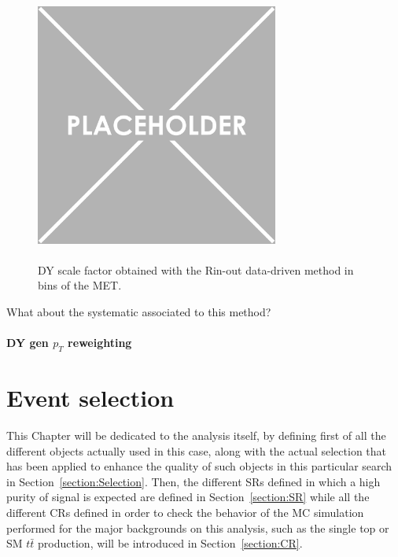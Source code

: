 \documentclass[a4paper, 10pt, openright]{report}
\begin{document}
\begin{figure}[htbp]
\begin{center}
\includegraphics[width=8cm, height=9cm]{figs/placeholder.png}
\caption{\ac{DY} scale factor obtained with the Rin-out data-driven method in bins of the \ac{MET}.}
\label{fig:Rinoutcheck}
\end{center}
\end{figure}

\color{red} What about the systematic associated to this method? \color{black}

\subsubsection{\ac{DY} gen $p_T$ reweighting}

























\chapter{Event selection} \label{chapter:Selection}

This Chapter will be dedicated to the analysis itself, by defining first of all the different objects actually used in this case, along with the actual selection that has been applied to enhance the quality of such objects in this particular search in Section~\ref{section:Selection}. Then, the different \acfp{SR} defined in which a high purity of signal is expected are defined in Section~\ref{section:SR} while all the different \acfp{CR} defined in order to check the behavior of the \ac{MC} simulation performed for the major backgrounds on this analysis, such as the single top or \ac{SM} $t \bar t$ production, will be introduced in Section~\ref{section:CR}. 
\end{document}
